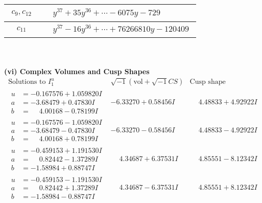 \documentclass[1p]{elsarticle_modified}
\theoremstyle{definition}
\newcommand{\I}{\sqrt{-1}}
\begin{document}
\begin{tabular}{m{50pt}|m{274pt}}
\hline $$\begin{aligned}c_{9},c_{12}\end{aligned}$$&$\begin{aligned}
&y^{37}+35 y^{36}+\cdots-6075 y-729
\end{aligned}$\\
\hline $$\begin{aligned}c_{11}\end{aligned}$$&$\begin{aligned}
&y^{37}-16 y^{36}+\cdots+76266810 y-120409
\end{aligned}$\\
\hline
\end{tabular}\\~\\
\newpage\flushleft \textbf{(vi) Complex Volumes and Cusp Shapes}
$$\begin{array}{c|c|c}  
\text{Solutions to }I^u_{1}& \I (\text{vol} + \sqrt{-1}CS) & \text{Cusp shape}\\
 \hline 
\begin{aligned}
u &= -0.167576 + 1.059820 I \\
a &= -3.68479 + 0.47830 I \\
b &= \phantom{-}4.00168 - 0.78199 I\end{aligned}
 & -6.33270 + 0.58456 I & \phantom{-}4.48833 + 4.92922 I \\ \hline\begin{aligned}
u &= -0.167576 - 1.059820 I \\
a &= -3.68479 - 0.47830 I \\
b &= \phantom{-}4.00168 + 0.78199 I\end{aligned}
 & -6.33270 - 0.58456 I & \phantom{-}4.48833 - 4.92922 I \\ \hline\begin{aligned}
u &= -0.459153 + 1.191530 I \\
a &= \phantom{-}0.82442 - 1.37289 I \\
b &= -1.58984 + 0.88747 I\end{aligned}
 & \phantom{-}4.34687 + 6.37531 I & \phantom{-}4.85551 - 8.12342 I \\ \hline\begin{aligned}
u &= -0.459153 - 1.191530 I \\
a &= \phantom{-}0.82442 + 1.37289 I \\
b &= -1.58984 - 0.88747 I\end{aligned}
 & \phantom{-}4.34687 - 6.37531 I & \phantom{-}4.85551 + 8.12342 I \\ \hline\begin{aligned}

\end{aligned}
\end{array}$$
\end{document}
